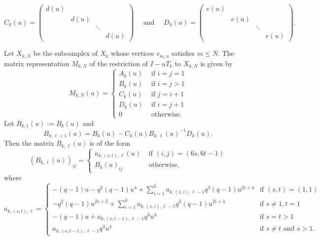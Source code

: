 \documentclass[11pt]{amsart}
\theoremstyle{definition}
\theoremstyle{remark}
\numberwithin{equation}{section}
\begin{document}
\[
C_k(u)=
\begin{pmatrix}
d(u) &      &      & \\
     & d(u) &      & \\
     &      & \ddots & \\
     &      &      & d(u)
\end{pmatrix} \quad\textrm{ and }\quad D_k(u)=
\begin{pmatrix}
e(u) &      &      & \\
     & e(u) &      & \\
     &      & \ddots & \\
     &      &      & e(u)
\end{pmatrix}.
\]


 Let $X_{k,N}$ be the subcomplex of $X_k$ whose vertices $v_{m,n}$ satisfies $m\leq N.$ The matrix representation $M_{k,N}$ of the restriction of $I-uT_{k}$ to $X_{k,N}$ is given by
\begin{equation*}
M_{k,N}(u)=\begin{cases}
A_k(u)&\text{ if }i=j=1\\
B_k(u)&\text{ if }i=j>1\\
C_k(u)&\text{ if }j=i+1\\
D_k(u)&\text{ if }i=j+1\\
0&\text{ otherwise}.
\end{cases}
\end{equation*}
Let $B_{k,1}(u):=B_k(u)$ and 
$$B_{k,\ell+1}(u)=B_k(u)-C_k(u)B_{k,\ell}(u)^{-1}D_k(u).$$
Then the matrix $B_{k,\ell}(u)$ is of the form
\begin{equation*}
(B_{k,\ell}(u))_{ij}=\begin{cases}a_{k,(s,t),\ell}(u)&\text{ if }(i,j)=(6s,6t-1)\\
B_{k}(u)_{ij}&\text{ otherwise},\end{cases}
\end{equation*}
where
\begin{equation*}
a_{k,(s,t),\ell}=\begin{cases}
-(q-1)u-q^2(q-1)u^4+\displaystyle\sum_{i=1}^k a_{k,(1,i),\ell-1}q^{3}(q-1)u^{2i+4}&\text{if }(s,t)=(1,1)\\
-q^{2}(q-1)u^{2s+2}+\displaystyle\sum_{i=1}^k a_{k,(s,i),\ell-1}q^{3}(q-1)u^{2i+4}&\text{if }s\neq 1,t=1\\
-(q-1)u+a_{k,(s,t-1),\ell-1}q^3u^4&\text{if } s=t>1\\
a_{k,(s,t-1),\ell-1}q^3u^4&\text{if } s\neq t\text{ and }s>1.
\end{cases}
\end{equation*}
\end{document}

